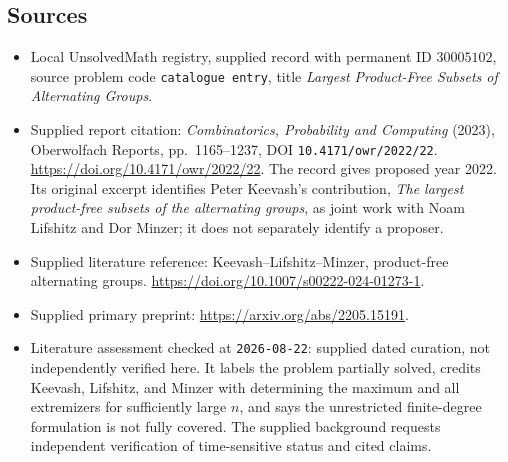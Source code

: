 \documentclass[11pt]{article}
\begin{document}
\subsection{Sources}
\begin{itemize}
\item Local UnsolvedMath registry, supplied record with permanent ID \(30005102\), source problem code \texttt{catalogue entry}, title \emph{Largest Product-Free Subsets of Alternating Groups}.
\item Supplied report citation: \emph{Combinatorics, Probability and Computing} (2023), Oberwolfach Reports, pp.\ 1165--1237, DOI \texttt{10.4171/owr/2022/22}. \url{https://doi.org/10.4171/owr/2022/22}. The record gives proposed year 2022. Its original excerpt identifies Peter Keevash's contribution, \emph{The largest product-free subsets of the alternating groups}, as joint work with Noam Lifshitz and Dor Minzer; it does not separately identify a proposer.
\item Supplied literature reference: Keevash--Lifshitz--Minzer, product-free alternating groups. \url{https://doi.org/10.1007/s00222-024-01273-1}.
\item Supplied primary preprint: \url{https://arxiv.org/abs/2205.15191}.
\item Literature assessment checked at \texttt{2026-08-22}: supplied dated curation, not independently verified here. It labels the problem partially solved, credits Keevash, Lifshitz, and Minzer with determining the maximum and all extremizers for sufficiently large \(n\), and says the unrestricted finite-degree formulation is not fully covered. The supplied background requests independent verification of time-sensitive status and cited claims.
\end{itemize}
\end{document}
